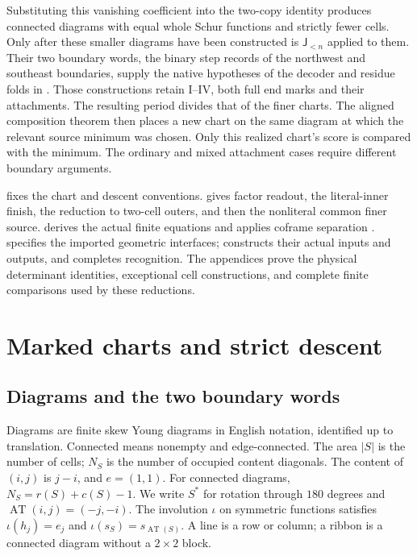 \documentclass[11pt,a4paper]{amsart}
\numberwithin{equation}{section}
\theoremstyle{plain}
\theoremstyle{definition}
\newcommand{\AT}{\operatorname{AT}}
\newcommand{\Jlower}{\mathsf J_{<n}}
\newcommand{\ii}{\iota}
\begin{document}
Substituting this vanishing coefficient into the two-copy identity
produces connected diagrams with equal whole Schur functions and strictly
fewer cells.  Only after these smaller diagrams have been constructed is
\(\Jlower\) applied to them.  Their two boundary words, the binary step
records of the northwest and southeast boundaries, supply the native
hypotheses of the decoder and residue folds in \cite{Shields2026Gluing}.
Those constructions retain I--IV, both full end marks and their
attachments.  The resulting period divides that of the finer charts.
The aligned composition theorem \cite{Shields2026Gluing} then places a new chart on
the same diagram at which the relevant source minimum was chosen.
Only this realized chart's score is compared with the minimum.
The ordinary and mixed attachment cases require different boundary
arguments.

 fixes the chart and descent conventions.
 gives factor readout, the literal-inner finish,
the reduction to two-cell outers, and then the nonliteral common finer source.
 derives the actual finite equations and applies
coframe separation \cite{Shields2026Coframes}.
 specifies the imported geometric interfaces;
 constructs their actual inputs and outputs,
and  completes recognition.
The appendices prove the physical determinant identities, exceptional
cell constructions, and complete finite comparisons used by these reductions.

\section{Marked charts and strict descent}\label{sec:charts}

\subsection{Diagrams and the two boundary words}

Diagrams are finite skew Young diagrams in English notation, identified up to translation.  Connected means nonempty and edge-connected.  The area \(|S|\) is the number of cells; \(N_S\) is the number of occupied content diagonals.  The content of \((i,j)\) is \(j-i\), and \(e=(1,1)\).  For connected diagrams, \(N_S=r(S)+c(S)-1\).  We write \(S^*\) for rotation through \(180\) degrees and \(\AT(i,j)=(-j,-i)\).  The involution \(\ii\) on symmetric functions satisfies \(\ii(h_j)=e_j\) and \(\ii(s_S)=s_{\AT(S)}\).  A line is a row or column; a ribbon is a connected diagram without a \(2\times2\) block.
\end{document}
